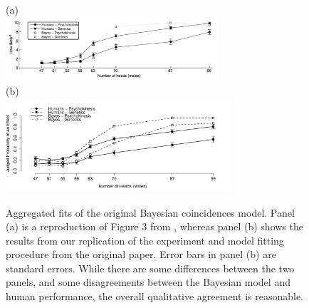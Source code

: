 \documentclass[doc,floatsintext]{apa6}
\begin{document}
\begin{figure}[!t]
	\centering
	(a) \\
	\includegraphics[width=0.7\textwidth]{coincidences_figures/gt1aggregate.pdf} \\
	(b) \\
	\includegraphics[width=0.75\textwidth]{coincidences_figures/usaggregate.pdf} \\
	\caption{Aggregated fits of the original Bayesian coincidences model. Panel (a) is a reproduction of Figure 3 from \protect{}, whereas panel (b) shows the results from our replication of the experiment and model fitting procedure from the original paper. Error bars in panel (b) are standard errors. While there are some differences between the two panels, and some disagreements between the Bayesian model and human performance, the overall qualitative agreement is reasonable.}
	\label{fig:aggregate}
\end{figure}
\end{document}
